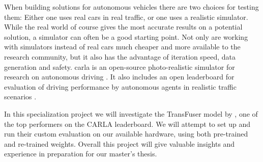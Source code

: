 

When building solutions for autonomous vehicles there are two choices for testing them: Either one uses real cars in real traffic, or one uses a realistic simulator. While the real world of course gives the most accurate results on a potential solution, a simulator can often be a good starting point. Not only are working with simulators instead of real cars much cheaper and more available to the research community, but it also has the advantage of iteration speed, data generation and safety. \acrfull{carla} is an open-source photo-realistic simulator for research on autonomous driving \cite{introducing-carla-paper}. It also includes an open leaderboard for evaluation of driving performance by autonomous agents in realistic traffic scenarios \cite{carla-leaderboard}.  

In this specialization project we will investigate the TransFuser model by \textcite{transfuser-pami}, one of the top performers on the CARLA leaderboard. We will attempt to set up and run their custom evaluation on our available hardware, using both pre-trained and re-trained weights. Overall this project will give valuable insights and experience in preparation for our master's thesis.


\begin{comment}
    
- How (connected) autonomous driving can mitigate traffic congestion, road safety, inefficient fuel consumption, etc. \cite{towards-connected-autonomous-driving}
- Mention why it is useful to experiment in a simulator? 
 --- Safety, easier to generate data, etc.

\end{comment}



